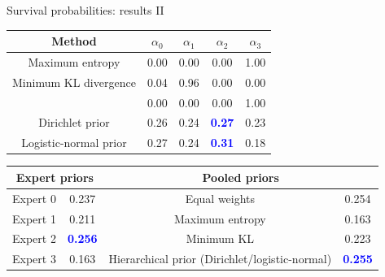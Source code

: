 \begin{frame}{Survival probabilities: results II}
\begin{table}[ht]
\centering
\begin{tabular}{ccccc}
  \hline
Method  & $\alpha_0$ & $\alpha_1$ & $\alpha_2$ & $\alpha_3$ \\ 
  \hline
Maximum entropy & 0.00 & 0.00 & 0.00 & 1.00 \\ 
Minimum KL divergence & 0.04 & 0.96 & 0.00 & 0.00 \\
\cite{rufo2012A} & 0.00 & 0.00 & 0.00& 1.00\\
Dirichlet prior & 0.26 & 0.24 & \textcolor{blue}{\textbf{0.27}} & 0.23 \\ 
Logistic-normal prior & 0.27 & 0.24 & \textcolor{blue}{\textbf{0.31}} & 0.18\\
 \hline
\end{tabular}
\label{tab:alphasBeta}
\end{table}
\begin{table}[ht]
\centering
\begin{tabular}{cccc}
   \hline
   \multicolumn{2}{c}{Expert priors} &  \multicolumn{2}{c}{Pooled priors} \\
   \hline
   Expert 0 & 0.237 & Equal weights & 0.254\\
   Expert 1 & 0.211 & Maximum entropy & 0.163 \\
   Expert 2 & \textcolor{blue}{\textbf{0.256}} & Minimum KL & 0.223 \\ 
   Expert 3 & 0.163 & Hierarchical prior (Dirichlet/logistic-normal) & \textcolor{blue}{\textbf{0.255}} \\
   \hline
\end{tabular}
\label{tab:marglikes}
\end{table}
\end{frame}
